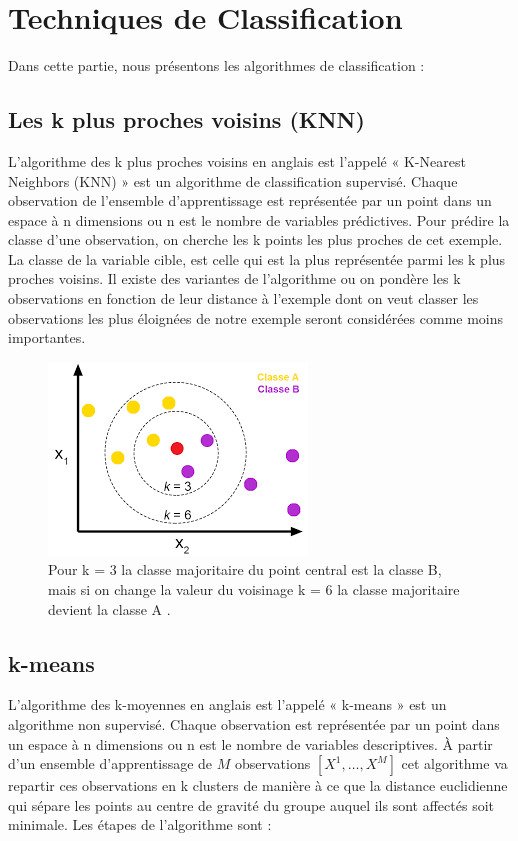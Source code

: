 \section{Techniques de Classification }
Dans cette partie, nous présentons les algorithmes de classification :

\subsection{Les k plus proches voisins (KNN) }
L’algorithme des k plus proches voisins en anglais est l'appelé « K-Nearest Neighbors (KNN) » est un algorithme de classification supervisé. Chaque observation de l’ensemble d’apprentissage est représentée par un point dans un espace à n dimensions ou n est le nombre de variables prédictives. Pour prédire la classe d’une observation, on cherche les k points les plus proches de cet exemple. La classe de la variable cible, est celle qui est la plus représentée parmi les k plus proches voisins. Il existe des variantes de l’algorithme ou on pondère les k observations en fonction de leur distance à l’exemple dont on veut classer les observations les plus éloignées de notre exemple seront considérées comme moins importantes.

\begin{figure}[!h]
\centering
\includegraphics[scale=0.8]{Images/Chapiter2/Les k plus proches voisins (KNN).png}
\caption{Pour k = 3 la classe majoritaire du point central est la classe B, mais si on change la valeur du voisinage k = 6 la classe majoritaire devient la classe A .}
\label{fig:03}
\end{figure}

\subsection{k-means }
L’algorithme des k-moyennes en anglais est l'appelé « k-means » est un algorithme non supervisé. Chaque observation est représentée par un point dans un espace à n dimensions ou n est le nombre de variables descriptives.
À partir d’un ensemble d’apprentissage de $M$ observations $[X^{1}, \ldots, X^{M}]$ cet algorithme va repartir ces observations en k clusters de manière à ce que la distance euclidienne qui sépare les points au centre de gravité du groupe auquel ils sont affectés soit minimale. Les étapes de l’algorithme sont :

